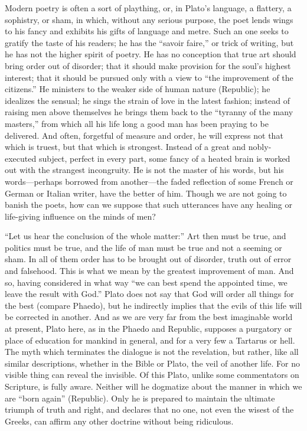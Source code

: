 \documentclass[11pt,letter]{article}
\begin{document}
\par  Modern poetry is often a sort of plaything, or, in Plato’s language, a flattery, a sophistry, or sham, in which, without any serious purpose, the poet lends wings to his fancy and exhibits his gifts of language and metre. Such an one seeks to gratify the taste of his readers; he has the “savoir faire,” or trick of writing, but he has not the higher spirit of poetry. He has no conception that true art should bring order out of disorder; that it should make provision for the soul’s highest interest; that it should be pursued only with a view to “the improvement of the citizens.” He ministers to the weaker side of human nature (Republic); he idealizes the sensual; he sings the strain of love in the latest fashion; instead of raising men above themselves he brings them back to the “tyranny of the many masters,” from which all his life long a good man has been praying to be delivered. And often, forgetful of measure and order, he will express not that which is truest, but that which is strongest. Instead of a great and nobly-executed subject, perfect in every part, some fancy of a heated brain is worked out with the strangest incongruity. He is not the master of his words, but his words—perhaps borrowed from another—the faded reflection of some French or German or Italian writer, have the better of him. Though we are not going to banish the poets, how can we suppose that such utterances have any healing or life-giving influence on the minds of men?

\par  “Let us hear the conclusion of the whole matter:” Art then must be true, and politics must be true, and the life of man must be true and not a seeming or sham. In all of them order has to be brought out of disorder, truth out of error and falsehood. This is what we mean by the greatest improvement of man. And so, having considered in what way “we can best spend the appointed time, we leave the result with God.” Plato does not say that God will order all things for the best (compare Phaedo), but he indirectly implies that the evils of this life will be corrected in another. And as we are very far from the best imaginable world at present, Plato here, as in the Phaedo and Republic, supposes a purgatory or place of education for mankind in general, and for a very few a Tartarus or hell. The myth which terminates the dialogue is not the revelation, but rather, like all similar descriptions, whether in the Bible or Plato, the veil of another life. For no visible thing can reveal the invisible. Of this Plato, unlike some commentators on Scripture, is fully aware. Neither will he dogmatize about the manner in which we are “born again” (Republic). Only he is prepared to maintain the ultimate triumph of truth and right, and declares that no one, not even the wisest of the Greeks, can affirm any other doctrine without being ridiculous.
\end{document}
